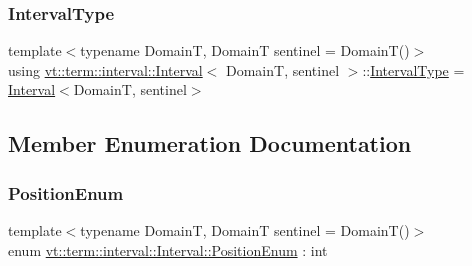 \subsubsection{\texorpdfstring{Interval\+Type}{IntervalType}}
{\footnotesize\ttfamily template$<$typename DomainT, DomainT sentinel = Domain\+T()$>$ \\
using \hyperlink{structvt_1_1term_1_1interval_1_1_interval}{vt\+::term\+::interval\+::\+Interval}$<$ DomainT, sentinel $>$\+::\hyperlink{structvt_1_1term_1_1interval_1_1_interval_a183b53c7344a9aa51c026dfe71b57ad4}{Interval\+Type} =  \hyperlink{structvt_1_1term_1_1interval_1_1_interval}{Interval}$<$DomainT, sentinel$>$}



\subsection{Member Enumeration Documentation}
\mbox{\label{structvt_1_1term_1_1interval_1_1_interval_adfdde0c1b12f536189432b168f6df6b3}} 
\subsubsection{\texorpdfstring{Position\+Enum}{PositionEnum}}
{\footnotesize\ttfamily template$<$typename DomainT, DomainT sentinel = Domain\+T()$>$ \\
enum \hyperlink{structvt_1_1term_1_1interval_1_1_interval_adfdde0c1b12f536189432b168f6df6b3}{vt\+::term\+::interval\+::\+Interval\+::\+Position\+Enum} \+: int\hspace{0.3cm}{\ttfamily [strong]}}

